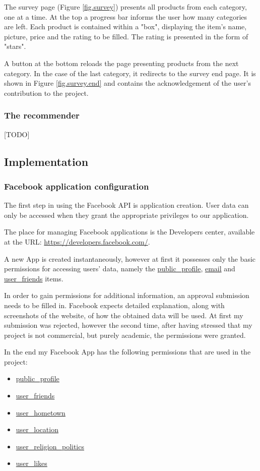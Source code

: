 \documentclass[12pt]{report}
\begin{document}
The survey page (Figure \ref{fig.survey}) presents all products from each category, one at a time. At the top a progress bar informs the user how many categories are left. Each product is contained within a "box", displaying the item's name, picture, price and the rating to be filled. The rating is presented in the form of "stars".

A button at the bottom reloads the page presenting products from the next category. In the case of the last category, it redirects to the survey end page. It is shown in Figure \ref{fig.survey.end} and contains the acknowledgement of the user's contribution to the project.

\subsubsection{The recommender}
[TODO]

\subsection{Implementation}

\subsubsection{Facebook application configuration}
The first step in using the Facebook API is application creation. User data can only be accessed when they grant the appropriate privileges to our application.

The place for managing Facebook applications is the Developers center, available at the URL: \url{https://developers.facebook.com/}.

A new App is created instantaneously, however at first it possesses only the basic permissions for accessing users' data, namely the \url{public_profile}, \url{email} and \url{user_friends} items.

In order to gain permissions for additional information, an approval submission needs to be filled in. Facebook expects detailed explanation, along with screenshots of the website, of how the obtained data will be used. At first my submission was rejected, however the second time, after having stressed that my project is not commercial, but purely academic, the permissions were granted.

In the end my Facebook App has the following permissions that are used in the project:
\begin{itemize}
\item \url{public_profile}
\item \url{user_friends}
\item \url{user_hometown}
\item \url{user_location}
\item \url{user_religion_politics}
\item \url{user_likes}
\end{itemize}
\end{document}
